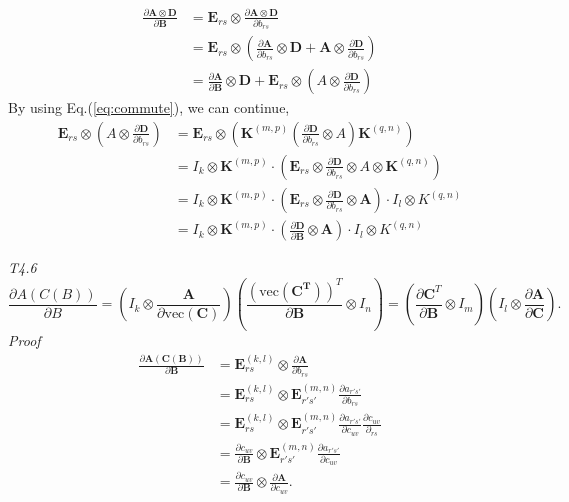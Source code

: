 \documentclass[a4paper,11pt]{article}
\def\m#1{\mathbf{#1}}
\def\v#1{\mathrm{vec}({\mathbf{#1}})}
\begin{document}
\begin{align}
    \frac{\partial \m A \otimes \m D}{\partial \m B} & = \m E_{rs} \otimes \frac{\partial \m A \otimes \m D}{\partial b_{rs}} \\ & = \m E_{rs} \otimes \left(\frac{\partial \m A}{\partial b_{rs}} \otimes \m D  + \m A \otimes \frac{\partial \m D}{\partial b_{rs}}\right)
    \\ & = \frac{\partial \m A}{\partial \m B}\otimes \m D +\m E_{rs} \otimes (A \otimes \frac{\partial \m D}{\partial b_{rs}})
\end{align}
By using Eq.(\ref{eq:commute}), we can continue,
\begin{align}
\m E_{rs} \otimes (A \otimes \frac{\partial \m D}{\partial b_{rs}}) & =\m E_{rs} \otimes \left(\m K^{(m,p)} (\frac{\partial \m D}{\partial b_{rs}} \otimes A) \m K^{(q,n)}\right) \\ & = I_k \otimes \m K^{(m,p)} \cdot \left(\m E_{rs} \otimes \frac{\partial \m D}{\partial b_{rs}} \otimes A \otimes \m K^{(q,n)}\right) \\ & = I_k \otimes \m K^{(m,p)} \cdot \left(\m E_{rs} \otimes \frac{\partial \m D}{\partial b_{rs}} \otimes \m A\right) \cdot I_l \otimes K^{(q,n)} \\ & = I_k \otimes \m K^{(m,p)} \cdot \left( \frac{\partial \m D}{\partial \m B}  \otimes \m A\right) \cdot I_l \otimes K^{(q,n)} 
\end{align}

\emph{T4.6}
\begin{equation}
    \frac{\partial A(C(B))}{\partial B} = \left(I_k \otimes \frac{\m A}{\partial \v C}\right) \left(\frac{(\v{C^T})^T}{\partial \m B}\otimes I_n\right) = \left(\frac{\partial \m C^T}{\partial \m B} \otimes I_m\right) \left(I_l \otimes \frac{\partial \m A}{\partial \m C}\right).
\end{equation}
\emph{Proof}
\begin{align}
    \frac{\partial \m A(\m C(\m B))}{\partial \m B} & = \m E^{(k,l)}_{rs} \otimes \frac{\partial \m A}{\partial b_{rs}} \\ & = \m E^{(k,l)}_{rs} \otimes \m E_{r's'}^{(m,n)} \frac{\partial a_{r's'}}{\partial b_{rs}} \\ & = \m E^{(k,l)}_{rs} \otimes \m E_{r's'}^{(m,n)} \frac{\partial a_{r's'}}{\partial c_{uv}} \frac{\partial c_{uv}}{\partial_{rs}} \\
    & = \frac{\partial c_{uv}}{\partial \m B} \otimes \m E_{r's'}^{(m,n)} \frac{\partial a_{r's'}}{\partial c_{uv}} \\ & = \frac{\partial c_{uv}}{\partial \m B} \otimes \frac{\partial \m A}{\partial c_{uv}}.
    \label{eq:chain_rule}
\end{align}
\end{document}
